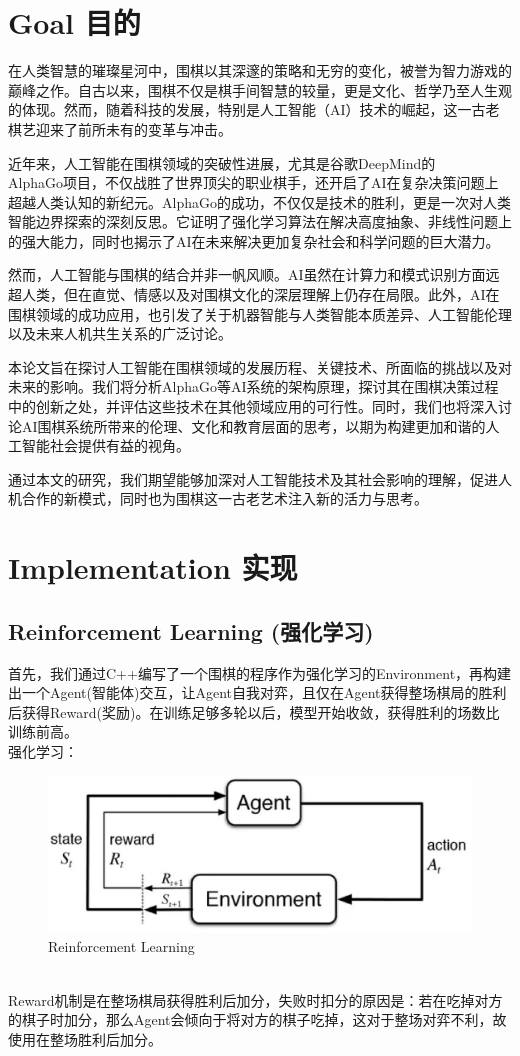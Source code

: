 \documentclass[a4paper]{article}
\begin{document}
	\section{Goal 目的}
	在人类智慧的璀璨星河中，围棋以其深邃的策略和无穷的变化，被誉为智力游戏的巅峰之作。自古以来，围棋不仅是棋手间智慧的较量，更是文化、哲学乃至人生观的体现。然而，随着科技的发展，特别是人工智能（AI）技术的崛起，这一古老棋艺迎来了前所未有的变革与冲击。
	
	近年来，人工智能在围棋领域的突破性进展，尤其是谷歌DeepMind的\\AlphaGo项目，不仅战胜了世界顶尖的职业棋手，还开启了AI在复杂决策问题上超越人类认知的新纪元。AlphaGo的成功，不仅仅是技术的胜利，更是一次对人类智能边界探索的深刻反思。它证明了强化学习算法在解决高度抽象、非线性问题上的强大能力，同时也揭示了AI在未来解决更加复杂社会和科学问题的巨大潜力。
	
	然而，人工智能与围棋的结合并非一帆风顺。AI虽然在计算力和模式识别方面远超人类，但在直觉、情感以及对围棋文化的深层理解上仍存在局限。此外，AI在围棋领域的成功应用，也引发了关于机器智能与人类智能本质差异、人工智能伦理以及未来人机共生关系的广泛讨论。
	
	本论文旨在探讨人工智能在围棋领域的发展历程、关键技术、所面临的挑战以及对未来的影响。我们将分析AlphaGo等AI系统的架构原理，探讨其在围棋决策过程中的创新之处，并评估这些技术在其他领域应用的可行性。同时，我们也将深入讨论AI围棋系统所带来的伦理、文化和教育层面的思考，以期为构建更加和谐的人工智能社会提供有益的视角。
	
	通过本文的研究，我们期望能够加深对人工智能技术及其社会影响的理解，促进人机合作的新模式，同时也为围棋这一古老艺术注入新的活力与思考。
	
	\section{Implementation  实现}
	\subsection{Reinforcement Learning  (强化学习)}
	首先，我们通过C++编写了一个围棋的程序作为强化学习的Environment，再构建出一个Agent(智能体)交互，让Agent自我对弈，且仅在Agent获得整场棋局的胜利后获得Reward(奖励)。在训练足够多轮以后，模型开始收敛，获得胜利的场数比训练前高。\\
	强化学习：
	\begin{figure}[htbp]
		\centering
		\includegraphics[scale=0.2]{RL.eps}
		\caption{Reinforcement Learning}
		\label{figure}
	\end{figure}\\
	Reward机制是在整场棋局获得胜利后加分，失败时扣分的原因是：若在吃掉对方的棋子时加分，那么Agent会倾向于将对方的棋子吃掉，这对于整场对弈不利，故使用在整场胜利后加分。
\end{document}
